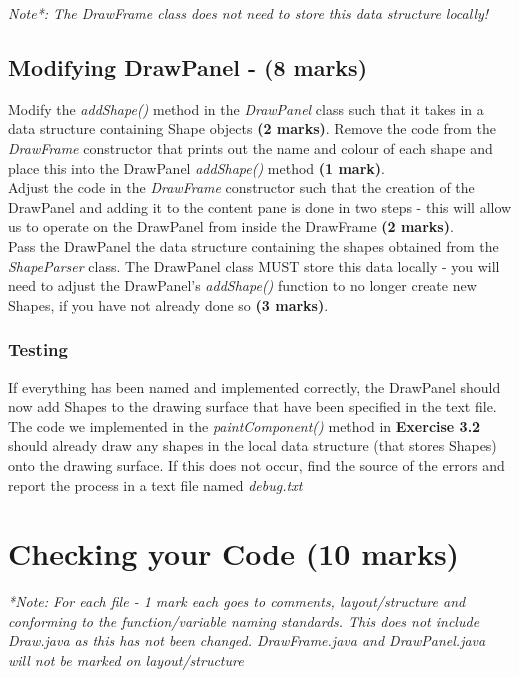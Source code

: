 \documentclass[a4paper,12pt]{article}
\begin{document}
\textit{Note*: The DrawFrame class does not need to store this data structure locally!}

\newpage
\subsection{Modifying DrawPanel - (8 marks)}
Modify the \textit{addShape()} method in the \textit{DrawPanel} class such that it takes in a data structure containing Shape objects {\bf (2 marks)}. Remove the code from the \textit{DrawFrame} constructor that prints out the name and colour of each shape and place this into the DrawPanel \textit{addShape()} method {\bf (1 mark)}.\\

Adjust the code in the \textit{DrawFrame} constructor such that the creation of the DrawPanel and adding it to the content pane is done in two steps - this will allow us to operate on the DrawPanel from inside the DrawFrame {\bf (2 marks)}.\\

Pass the DrawPanel the data structure containing the shapes obtained from the \textit{ShapeParser} class. The DrawPanel class MUST store this data locally - you will need to adjust the DrawPanel's \textit{addShape()} function to no longer create new Shapes, if you have not already done so {\bf (3 marks)}.

\subsubsection{Testing}
If everything has been named and implemented correctly, the DrawPanel should now add Shapes to the drawing surface that have been specified in the text file. The code we implemented in the \textit{paintComponent()} method in {\bf Exercise 3.2} should already draw any shapes in the local data structure (that stores Shapes) onto the drawing surface. If this does not occur, find the source of the errors and report the process in a text file named \textit{debug.txt}


\newpage
\section{Checking your Code (10 marks)}
\textit{*Note: For each file - 1 mark each goes to comments, layout/structure and conforming to the function/variable naming standards. This does not include Draw.java as this has not been changed. DrawFrame.java and DrawPanel.java will not be marked on layout/structure}\\
\end{document}
